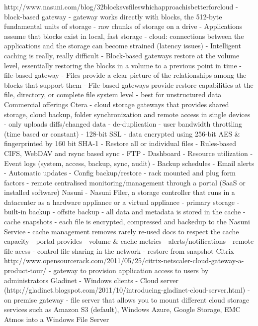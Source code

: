 			http://www.nasuni.com/blog/32blocksvsfileswhichapproachisbetterforcloud
				- block-based gateway
					- gateway works directly with blocks, the 512-byte fundamental units of storage
					- raw chunks of storage on a drive
					- Applications assume that blocks exist in local, fast storage
						- cloud: connections between the applications and the storage can become strained (latency issues)
					- Intelligent caching is really, really difficult 
					- Block-based gateways restore at the volume level, essentially restoring the blocks in a volume to a previous point in time
				- file-based gateway
					- Files provide a clear picture of the relationships among the blocks that support them
					- File-based gateways provide restore capabilities at the file, directory, or complete file system level
					- best for unstructured data
		Commercial offerings
			Ctera
				- cloud storage gateways that provides shared storage, cloud backup, folder synchronization and remote access in single devices
					- only uploads diffs/changed data
					- de-duplication
					- user bandwidth throttling (time based or constant)
					- 128-bit SSL
					- data encrypted using 256-bit AES \& fingerprinted by 160 bit SHA-1
					- Restore all or individual files
					- Rules-based CIFS, WebDAV and rsync based sync
					- FTP
					- Dashboard
						- Resource utilization
						- Event logs (system, access, backup, sync, audit)
						- Backup schedules
					- Email alerts
					- Automatic updates
					- Config backup/restore
				- rack mounted and plug form factors
				- remote centralised monitoring/management through a portal (SaaS or installed software)
			Nasuni
				- Nasuni Filer, a storage controller that runs in a datacenter as a hardware appliance or a virtual appliance
					- primary storage
					- built-in backup
					- offsite backup
					- all data and metadata is stored in the cache
					- cache snapshots
						- each file is encrypted, compressed and backedup to the Nasuni Service
					- cache management removes rarely re-used docs to respect the cache capacity
				- portal provides
					- volume \& cache metrics
					- alerts/notifications
					- remote file accss
					- control file sharing in the network
					- restore from snapshot
			Citrix
			http://www.opensourcerack.com/2011/05/25/citrix-netscaler-cloud-gateway-a-product-tour/
				- gateway to provision application access to users by administrators
			Gladinet 
				- Windows clients
				- Cloud server (http://gladinet.blogspot.com/2011/10/introducing-gladinet-cloud-server.html)
					- on premise gateway
					- file server that allows you to mount different cloud storage services such as Amazon S3 (default), Windows Azure, Google Storage, EMC Atmos into a Windows File Server
